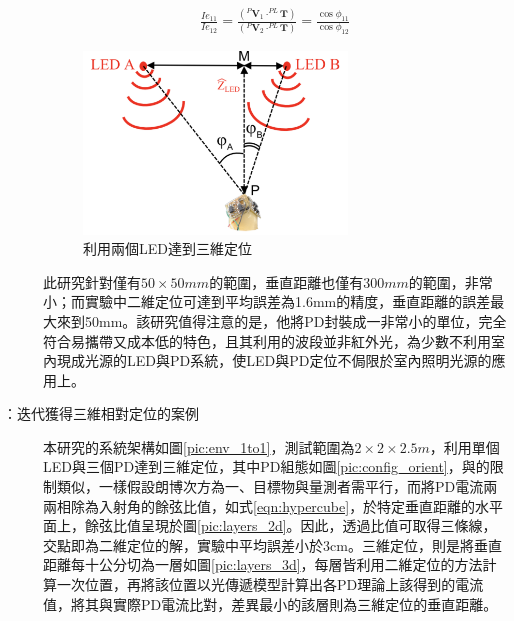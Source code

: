 \begin{description}
        \begin{equation}
            \label{eqn:hypercube}
            \begin{aligned}
                    \frac{Ie_{11}}{Ie_{12}}= 
                \frac{
                    ( ^{P}\boldsymbol{V}_1 \cdot 
                    ^{PL}\boldsymbol{T}
                    )
                 } 
                    {
                        ( ^{P}\boldsymbol{V}_2 \cdot 
                                ^{PL}\boldsymbol{T}
                        )
                    }=\frac{\cos\phi_{11}}{\cos\phi_{12}}
            \end{aligned}
        \end{equation}

        \begin{figure}[h]
            \centering
            \includegraphics[width=7cm]{ch2pic/hypercube_2led.png}
            \caption{\cite{case:hypercube}利用兩個LED達到三維定位}
            \label{pic:hypercube_2led}
        \end{figure}
        
        此研究針對僅有$50\times 50mm$的範圍，垂直距離也僅有$300mm$的範圍，非常小；而實驗中二維定位可達到平均誤差為1.6mm的精度，垂直距離的誤差最大來到50mm。該研究值得注意的是，他將PD封裝成一非常小的單位，完全符合易攜帶又成本低的特色，且其利用的波段並非紅外光，為少數不利用室內現成光源的LED與PD系統，使LED與PD定位不侷限於室內照明光源的應用上。

        \item[\cite{case:3d_layers}：迭代獲得三維相對定位的案例] \hfill 
        
        \qquad
        本研究的系統架構如圖\ref{pic:env_1to1}，測試範圍為$2\times 2\times 2.5m$，利用單個LED與三個PD達到三維定位，其中PD組態如圖\ref{pic:config_orient}，與\cite{case:hypercube}的限制類似，一樣假設朗博次方為一、目標物與量測者需平行，而將PD電流兩兩相除為入射角的餘弦比值，如式\ref{eqn:hypercube}，於特定垂直距離的水平面上，餘弦比值呈現於圖\ref{pic:layers_2d}。因此，透過比值可取得三條線，交點即為二維定位的解，實驗中平均誤差小於3cm。三維定位，則是將垂直距離每十公分切為一層如圖\ref{pic:layers_3d}，每層皆利用二維定位的方法計算一次位置，再將該位置以光傳遞模型計算出各PD理論上該得到的電流值，將其與實際PD電流比對，差異最小的該層則為三維定位的垂直距離。


\end{description}
